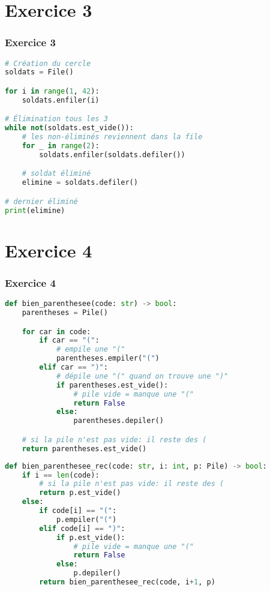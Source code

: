 \documentclass[svgnames,11pt]{beamer}
\begin{document}
\section{Exercice 3}
\begin{frame}[fragile]
    \frametitle{Exercice 3}

\begin{lstlisting}[language=Python , basicstyle=\ttfamily\small, xleftmargin=2em, xrightmargin=2em]
# Création du cercle
soldats = File()

for i in range(1, 42):
    soldats.enfiler(i)

# Élimination tous les 3
while not(soldats.est_vide()):
    # les non-éliminés reviennent dans la file
    for _ in range(2):
        soldats.enfiler(soldats.defiler())

    # soldat éliminé
    elimine = soldats.defiler()

# dernier éliminé
print(elimine)
\end{lstlisting}

\end{frame}
\section{Exercice 4}
\begin{frame}[fragile]
    \frametitle{Exercice 4}

\begin{lstlisting}[language=Python , basicstyle=\ttfamily\small, xleftmargin=.5em, xrightmargin=-1em]
def bien_parenthesee(code: str) -> bool:
    parentheses = Pile()

    for car in code:
        if car == "(":
            # empile une "("
            parentheses.empiler("(")
        elif car == ")":
            # dépile une "(" quand on trouve une ")"
            if parentheses.est_vide():
                # pile vide = manque une "("
                return False
            else:
                parentheses.depiler()

    # si la pile n'est pas vide: il reste des (
    return parentheses.est_vide()
\end{lstlisting}

\end{frame}
\begin{frame}[fragile]

\begin{lstlisting}[language=Python , basicstyle=\ttfamily\small, xleftmargin=0em, xrightmargin=-5em]
def bien_parenthesee_rec(code: str, i: int, p: Pile) -> bool:
    if i == len(code):
        # si la pile n'est pas vide: il reste des (
        return p.est_vide()
    else:
        if code[i] == "(":
            p.empiler("(")
        elif code[i] == ")":
            if p.est_vide():
                # pile vide = manque une "("
                return False
            else:
                p.depiler()
        return bien_parenthesee_rec(code, i+1, p)
\end{lstlisting}

\end{frame}
\end{document}
